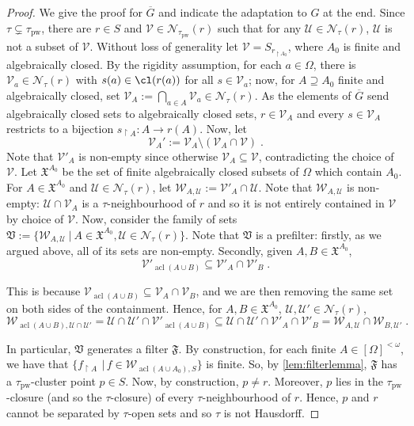 \documentclass{article}
\theoremstyle{remark}
\theoremstyle{definition}
\DeclareMathOperator{\acl}{acl}
\newcommand{\U}[0]{\mathbb{U}}
\newcommand{\nn}[0]{S}%
\renewcommand{\U}[0]{\mathcal{U}}
\newcommand{\V}[0]{\mathcal{V}}
\newcommand{\pw}[0]{\tau_{\mathrm{pw}}}
\newcommand{\X}[0]{\mathfrak{X}}
\newcommand{\fps}[1]{[#1]^{<\omega}}
\begin{document}
{{{{{   \begin{proof} 
  We give the proof for $\overline{G}$ and indicate the adaptation to $G$ at the end. Since $\tau\subsetneq\pw$, there are $r\in S$ and $\V\in\mathcal{N}_{\pw}(r)$ such that for any {$\U\in\mathcal{N}_\tau(r)$}, $\U$ is not a subset of $\V$. Without loss of generality let $\V=\nn_{r_{\upharpoonright A_0}}$, {where $A_0$ is finite and algebraically closed.}  {By the rigidity assumption, for each $a \in \Omega$, there is $\V_a \in \mathcal{N}_\tau(r)$ with  $s(a) \in \cl(r(a))$ for all $s \in \V_a$; 
now, for $A\supseteq A_0$ finite and algebraically closed, 
 set $\V_A := \bigcap_{a \in A} \V_a \in \mathcal{N}_\tau(r)$.
  As the elements of $\overline{G}$ send algebraically closed sets to algebraically closed sets,   $r \in \V_A$ and every $s \in \V_A$ restricts to a bijection $s_{\upharpoonright A}: A\to r(A)$. Now, let }
   \[\V_A':=\V_A\setminus(\V_A\cap\V)\;.\]
  {Note that $\V'_A$ is non-empty since otherwise $\V_A\subseteq \V$, contradicting the choice of $\V$. Let $\X^{A_0}$ be the set of finite algebraically closed subsets of $\Omega$ which contain $A_0$. For $A\in\X^{A_0}$ and $\mathcal{U}\in\mathcal{N}_\tau(r)$, let $\mathcal{W}_{A, \mathcal{U}}:=\V'_A\cap \mathcal{U}$. Note that $\mathcal{W}_{A, \mathcal{U}}$  is non-empty: $\U\cap \V_A$ is a $\tau$-neighbourhood of $r$ and so it is not entirely contained in $\V$ by choice of $\V$.
   Now, 
   consider the family of sets $\mathfrak{V}:=\{\mathcal{W}_{A, \U}\ \vert \ A\in \X^{A_0}, \U\in\mathcal{N}_\tau(r)\}$. Note that $\mathfrak{V}$ is a prefilter: firstly, as we argued above, all of its sets are non-empty.} 
     Secondly,
   given $A, B\in \X^{A_0}$,
   \[\V'_{\acl(A\cup B)}\subseteq \V'_A\cap \V'_B\;.\]
   
 
  {This is because $\V_{\acl(A\cup B)}\subseteq \V_A\cap \V_B$, and we are then removing the same set on both sides of the containment. Hence, for $A, B\in\X^{A_0}$, $\mathcal{U}, \mathcal{U}'\in\mathcal{N}_\tau(r)$,}
\[\mathcal{W}_{\acl(A\cup B), \U\cap \U'}=\U\cap\U'\cap \V'_{\acl(A\cup B)}\subseteq \U\cap\U'\cap \V'_A\cap \V'_B=\mathcal{W}_{A, \U}\cap\mathcal{W}_{B, \U'}\;.\]
  
In particular, $\mathfrak{V}$ generates a filter $\mathfrak{F}$. 
{By construction, for each finite $A\in \fps{\Omega}$, we have that $\{f_{\upharpoonright A} \, \ \vert \, f\in\mathcal{W}_{\acl(A\cup A_0), S}\}$ is finite. So, by \cref{lem:filterlemma},} $\mathfrak{F}$ has a $\pw$-cluster point $p\in S$. Now, by construction, $p\neq r$. {Moreover, $p$ lies in the $\pw$-closure (and so the $\tau$-closure) of every $\tau$-neighbourhood of $r$. Hence, $p$ and $r$ cannot be separated by $\tau$-open sets
and so $\tau$ is not Hausdorff.}



\end{proof}}}}}}
\end{document}
